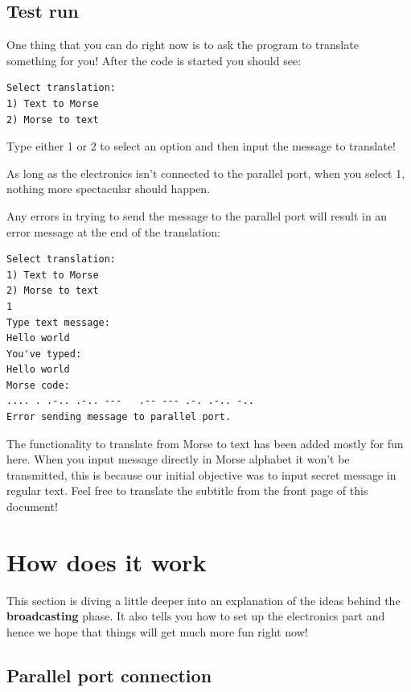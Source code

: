 \documentclass[12pt]{report}
\begin{document}
\subsection{Test run}

One thing that you can do right now is to ask the program to translate something for you! After the code is started you should see:

\begin{snugshade}
\begin{verbatim}
Select translation:
1) Text to Morse
2) Morse to text
\end{verbatim}
\end{snugshade}

Type either 1 or 2 to select an option and then input the message to translate!

As long as the electronics isn't connected to the parallel port, when you select 1, nothing more spectacular should happen.

Any errors in trying to send the message to the parallel port will result in an error message at the end of the translation:

\begin{snugshade}
\begin{verbatim}
Select translation:
1) Text to Morse
2) Morse to text
1
Type text message:
Hello world
You've typed: 
Hello world
Morse code: 
.... . .-.. .-.. ---   .-- --- .-. .-.. -.. 
Error sending message to parallel port.
\end{verbatim}
\end{snugshade}

The functionality to translate from Morse to text has been added mostly for fun here. When you input message directly in Morse alphabet it won't be transmitted, this is because our initial objective was to input secret message in regular text. Feel free to translate the subtitle from the front page of this document!

\section{How does it work} \label{sec:howB}

This section is diving a little deeper into an explanation of the ideas behind the \textbf{broadcasting} phase. It also tells you how to set up the electronics part and hence we hope that things will get much more fun right now!

\subsection{Parallel port connection} \label{sec:parportcon}
\end{document}
